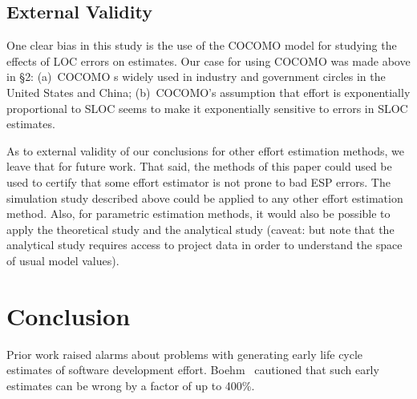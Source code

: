 \documentclass[final,twocolumn,5p]{elsarticle}
\theoremstyle{break}
\begin{document}
\subsection{External Validity}

One clear bias in this study is the use of the COCOMO model for studying the effects
of LOC errors on estimates. Our case for using COCOMO was made above in {\S}2: 
(a)~COCOMO s widely used in industry and government circles in the United States and China;
(b)~COCOMO's assumption that effort is exponentially proportional to SLOC seems to make it
exponentially sensitive to errors in SLOC estimates. 

As to external validity of our conclusions for  other effort estimation methods, we leave that for future work.
  That said, the methods of this paper could used be used to  certify that some effort
  estimator  is not prone to bad ESP
  errors.  The simulation study described above
   could be applied to any other
   effort estimation method. Also, for parametric estimation methods, it would also be possible to apply
   the theoretical study and the analytical study  (caveat: but
   note that the analytical study requires access to project data in order to understand the space of
  usual model values).
  
  

  
  
\section{Conclusion}
Prior work raised alarms about problems with generating early life cycle estimates of software
development effort. Boehm~\cite{boehm81} cautioned that such early estimates can be wrong by a factor of up to  400\%.
\end{document}
